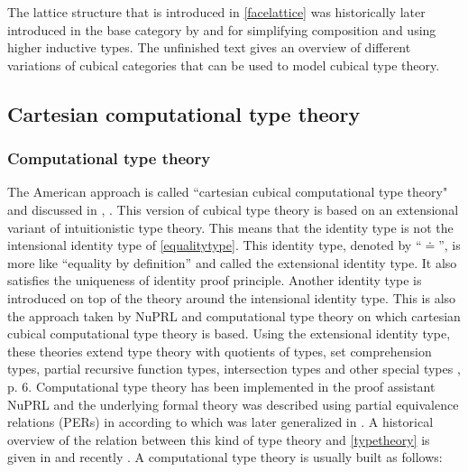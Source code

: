\documentclass[12pt,a4paper,twoside,xetex,draft]{book}
\begin{document}
The lattice structure that is introduced in \cref{facelattice} was historically later introduced in the base category by \cite{Cohen2016} and \cite{Huber2016} for simplifying composition and using higher inductive types. The unfinished text \cite{Awodey2016June} gives an overview of different variations of cubical categories that can be used to model cubical type theory.


\subsection{Cartesian computational type theory}\label{comptt}

\subsubsection{Computational type theory}

The American approach is called ``cartesian cubical computational type theory" and discussed in  \cite{Angiuli2017_2}, \cite{Angiuli2018}. This version of cubical type theory is based on an extensional variant of intuitionistic type theory. This means that the identity type is not the intensional identity type of \cref{equalitytype}. This identity type, denoted by ``$\doteq$'', is more like ``equality by definition'' and called the extensional identity type. It also satisfies the uniqueness of identity proof principle. Another identity type is introduced on top of the theory around the intensional identity type. This is also the approach taken by NuPRL and computational type theory on which cartesian cubical computational type theory is based. Using the extensional identity type, these theories extend type theory with quotients of types, set comprehension types, partial recursive function types, intersection types and other special types \cite{Constable2011}, p. 6.  Computational type theory has been implemented in the proof assistant NuPRL and the underlying formal theory was described using partial equivalence relations (PERs) in \cite{Allen1987} according to \cite{Angiuli2018} which was later generalized in \cite{Harper1991}. A historical overview of the relation between this kind of type theory and \cref{typetheory} is given in \cite{Constable2003} and recently \cite{Constable2015July}. A computational type theory is usually built as follows:
\end{document}
